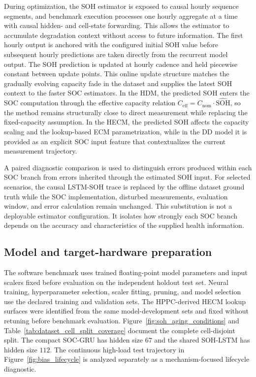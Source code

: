 \documentclass[review,nopreprintline]{elsarticle}
\begin{document}
During optimization, the SOH estimator is exposed to causal hourly sequence segments, and benchmark execution processes one hourly aggregate at a time with causal hidden- and cell-state forwarding. This allows the estimator to accumulate degradation context without access to future information. The first hourly output is anchored with the configured initial SOH value before subsequent hourly predictions are taken directly from the recurrent model output. The SOH prediction is updated at hourly cadence and held piecewise constant between update points. This online update structure matches the gradually evolving capacity fade in the dataset and supplies the latest SOH context to the faster SOC estimators. In the HDM, the predicted SOH enters the SOC computation through the effective capacity relation $C_{\mathrm{eff}} = C_{\mathrm{nom}} \cdot \widehat{\mathrm{SOH}}$, so the method remains structurally close to direct measurement while replacing the fixed-capacity assumption. In the HECM, the predicted SOH affects the capacity scaling and the lookup-based ECM parametrization, while in the DD model it is provided as an explicit SOC input feature that contextualizes the current measurement trajectory.

A paired diagnostic comparison is used to distinguish errors produced within each SOC branch from errors inherited through the estimated SOH input. For selected scenarios, the causal LSTM-SOH trace is replaced by the offline dataset ground truth while the SOC implementation, disturbed measurements, evaluation window, and error calculation remain unchanged. This substitution is not a deployable estimator configuration. It isolates how strongly each SOC branch depends on the accuracy and characteristics of the supplied health information.

\subsection{Model and target-hardware preparation}
The software benchmark uses trained floating-point model parameters and input scalers fixed before evaluation on the independent holdout test set. Neural training, hyperparameter selection, scaler fitting, pruning, and model selection use the declared training and validation sets. The HPPC-derived HECM lookup surfaces were identified from the same model-development sets and fixed without retuning before benchmark evaluation. Figure~\ref{fig:soh_aging_conditions} and Table~\ref{tab:dataset_cell_split_coverage} document the complete cell-disjoint split. The compact SOC-GRU has hidden size $67$ and the shared SOH-LSTM has hidden size $112$. The continuous high-load test trajectory in Figure~\ref{fig:bias_lifecycle} is analyzed separately as a mechanism-focused lifecycle diagnostic.
\end{document}

